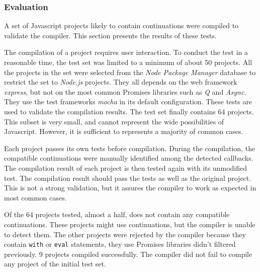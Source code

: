 \subsubsection{Evaluation} \label{chapter5:due:evaluation}

A set of Javascript projects likely to contain continuations were compiled to validate the compiler.
This section presents the results of these tests.


The compilation of a project requires user interaction.
To conduct the test in a reasonable time, the test set was limited to a minimum of about \num{50} projects.
All the projects in the set were selected from the \textit{Node Package Manager} database to restrict the set to \textit{Node.js} projects.
They all depends on the web framework \textit{express}, but not on the most common Promises libraries such as \textit{Q} and \textit{Async}.
They use the test frameworks \textit{mocha} in its default configuration.
These tests are used to validate the compilation results.
The test set finally contains 64 projects.
This subset is very small, and cannot represent the wide possibilities of Javascript.
However, it is sufficient to represents a majority of common cases.


Each project passes its own tests before compilation.
During the compilation, the compatible continuations were manually identified among the detected callbacks.
The compilation result of each project is then tested again with its unmodified test.
The compilation result should pass the tests as well as the original project.
This is not a strong validation, but it assures the compiler to work as expected in most common cases.


Of the 64 projects tested, almost a half, does not contain any compatible continuations.
These projects might use continuations, but the compiler is unable to detect them.
The other projects were rejected by the compiler because they contain \texttt{with} or \texttt{eval} statements, they use Promises libraries didn't filtered previously.
9 projects compiled successfully.
The compiler did not fail to compile any project of the initial test set.

